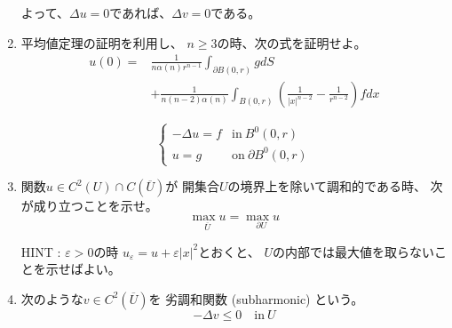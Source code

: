 \documentclass[12pt,b5paper]{ltjsarticle}
\begin{document}
\begin{enumerate}
      よって、$\Delta u=0$であれば、$\Delta v =0$である。

      \hrulefill


 \item

      平均値定理の証明を利用し、
      $n\geq 3$の時、次の式を証明せよ。
      \begin{equation}
       \begin{split}
       u(0) =& \frac{1}{n\alpha(n)r^{n-1}} \int_{\partial B(0,r)} g dS\\
         &+ \frac{1}{n(n-2)\alpha(n)} \int_{B(0,r)}
         \left( \frac{1}{\lvert x \rvert^{n-2}}
          -  \frac{1}{r^{n-2}}\right)  f dx
       \end{split}
      \end{equation}

      \begin{equation}
       \begin{cases}
        -\Delta u =f & \text{in}\: B^{0}(0,r)\\
        u=g & \text{on}\: \partial B^{0}(0,r)
       \end{cases}
      \end{equation}

      \dotfill



      \hrulefill

 \item

      関数$u \in C^{2}(U) \cap C(\overline{U})$が
      開集合$U$の境界上を除いて調和的である時、
      次が成り立つことを示せ。
      \begin{equation}
       \underset{\overline{U}}{\max {u}}
        = \underset{\partial{U}}{\max {u}}
      \end{equation}

      HINT :
      $\varepsilon >0$の時
      $u_{\varepsilon}=u+\varepsilon \lvert x \rvert^{2}$とおくと、
      $U$の内部では最大値を取らないことを示せばよい。

      \dotfill



      \hrulefill

 \item

      次のような$v\in C^{2}(\overline{U})$を 劣調和関数 (subharmonic) という。
      \begin{equation}
       -\Delta v \leq 0 \quad \text{in}\: U
      \end{equation}



\end{enumerate}
\end{document}
